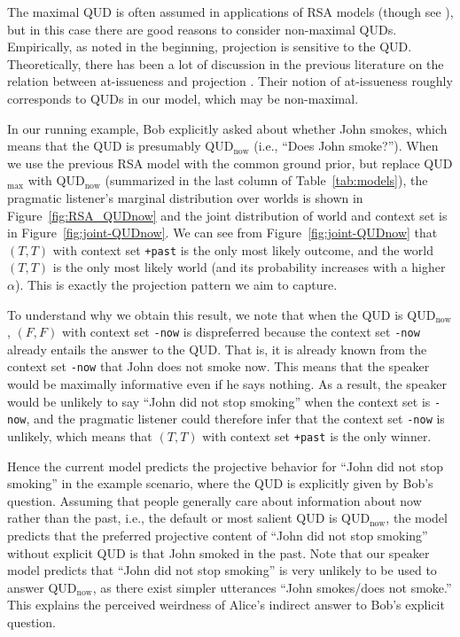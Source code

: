 The maximal QUD is often assumed in applications of RSA models (though see ), but 
 in this case there are good reasons to consider non-maximal QUDs.
Empirically, as noted in the beginning, projection is sensitive to the QUD.
Theoretically, there has been a lot of discussion in the previous literature on the relation between at-issueness and projection  \cite{Beaver2010:Have-You-Noticed, SimonsEtAl2001:What-Projects-and-Why}.
Their notion of at-issueness roughly corresponds to QUDs in our model,
 which may be non-maximal.

 
In our running example, Bob explicitly asked about whether John smokes, 
 which means that the QUD is presumably QUD$_\textrm{now}$ (i.e., ``Does John smoke?'').
When we use the previous RSA model with the common ground prior, but  
 replace QUD$_\textrm{max}$ with QUD$_\textrm{now}$ (summarized in the 
 last column of Table~\ref{tab:models}), the pragmatic listener's marginal distribution over worlds is shown in Figure~\ref{fig:RSA_QUDnow} and the joint
 distribution of world and context set is in Figure~\ref{fig:joint-QUDnow}.
We can see from Figure~\ref{fig:joint-QUDnow} that $(T, T)$ with context set
 \verb=+past= is 
 the only most likely outcome, and the world $(T, T)$ is the 
 only most likely world (and its probability increases with a higher $\alpha$).
This is exactly the projection pattern we aim to capture.

To understand why we obtain this result, we note that 
 when the QUD is QUD$_\textrm{now}$, $(F, F)$ with context set
 \verb=-now= is dispreferred because the context set \verb=-now= already entails 
 the answer to the QUD. 
That is, it is already known from the context set \verb=-now= that John does not 
 smoke now.
This means that the speaker would be maximally informative even if he says nothing.
As a result, the speaker would be unlikely to say ``John did not stop smoking'' 
 when the context set is \verb=-now=, and the pragmatic listener could therefore
 infer that the context set \verb=-now= is unlikely, which means that 
 $(T, T)$ with context set \verb=+past= is the only winner.
 
Hence the current model predicts the projective behavior for 
 ``John did not stop smoking'' in the example scenario, where the QUD is explicitly
 given by Bob's question. 
Assuming that people generally care about information about now rather than 
 the past, i.e., the default or most salient QUD is QUD$_\text{now}$,
the model predicts that the preferred projective content of 
 ``John did not stop smoking'' without explicit QUD is that 
 John smoked in the past.
Note that our speaker model predicts that ``John did not stop smoking''
 is very unlikely to be used to answer QUD$_\text{now}$, as there exist simpler utterances ``John smokes/does not smoke.'' 
This explains the perceived weirdness of Alice's indirect answer to 
 Bob's explicit question. 

